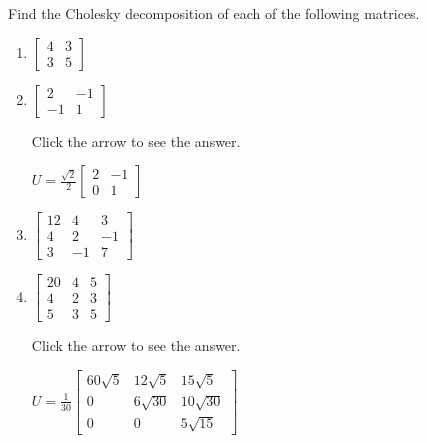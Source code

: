 \documentclass{ximera}
\begin{document}
\begin{problem}\label{prob:pos_def_1}
Find the Cholesky decomposition of each of the following matrices.

\begin{enumerate}
\item $\left[ \begin{array}{rr}
4 & 3 \\
3 & 5
\end{array}\right]$

\item $\left[ \begin{array}{rr}
2 & -1 \\
-1 & 1
\end{array}\right]$

Click the arrow to see the answer.
\begin{expandable}{}{}
$U = \frac{\sqrt{2}}{2} \left[ \begin{array}{rr}
2 & -1 \\
0 & 1
\end{array}\right]$
\end{expandable}

\item$\left[ \begin{array}{rrr}
12 & 4 & 3 \\
4 & 2 & -1 \\
3 & -1 & 7
\end{array}\right]$

\item $\left[ \begin{array}{rrr}
20 & 4 & 5 \\
4 & 2 & 3 \\
5 & 3 & 5
\end{array}\right]$

Click the arrow to see the answer.
\begin{expandable}{}{}
$U = \frac{1}{30} \left[ \begin{array}{ccc}
60\sqrt{5} & 12\sqrt{5} & 15\sqrt{5} \\
0 & 6\sqrt{30} & 10\sqrt{30} \\
0 & 0 & 5\sqrt{15}
\end{array}\right]$
\end{expandable}

\end{enumerate}

\end{problem}
\end{document}
